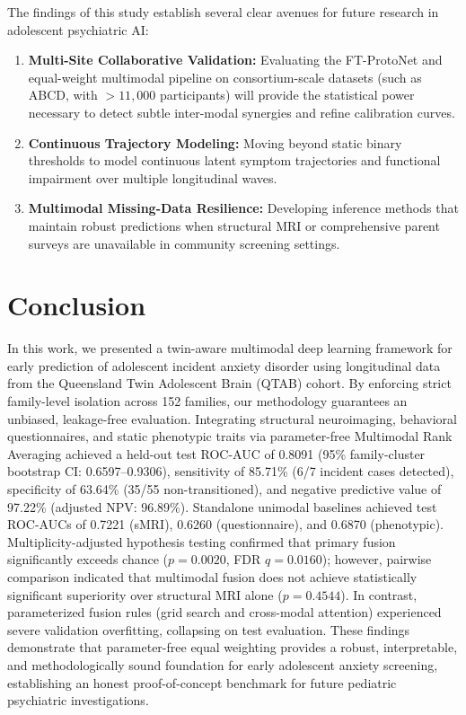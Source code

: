 \documentclass[10pt,letterpaper]{article}
\begin{document}
The findings of this study establish several clear avenues for future research in adolescent psychiatric AI:
\begin{enumerate}
    \item \textbf{Multi-Site Collaborative Validation:} Evaluating the FT-ProtoNet and equal-weight multimodal pipeline on consortium-scale datasets (such as ABCD, with $> 11{,}000$ participants) will provide the statistical power necessary to detect subtle inter-modal synergies and refine calibration curves.
    \item \textbf{Continuous Trajectory Modeling:} Moving beyond static binary thresholds to model continuous latent symptom trajectories and functional impairment over multiple longitudinal waves.
    \item \textbf{Multimodal Missing-Data Resilience:} Developing inference methods that maintain robust predictions when structural MRI or comprehensive parent surveys are unavailable in community screening settings.
\end{enumerate}

\section*{Conclusion}

In this work, we presented a twin-aware multimodal deep learning framework for early prediction of adolescent incident anxiety disorder using longitudinal data from the Queensland Twin Adolescent Brain (QTAB) cohort. By enforcing strict family-level isolation across 152 families, our methodology guarantees an unbiased, leakage-free evaluation. Integrating structural neuroimaging, behavioral questionnaires, and static phenotypic traits via parameter-free Multimodal Rank Averaging achieved a held-out test ROC-AUC of 0.8091 (95\% family-cluster bootstrap CI: 0.6597--0.9306), sensitivity of 85.71\% (6/7 incident cases detected), specificity of 63.64\% (35/55 non-transitioned), and negative predictive value of 97.22\% (adjusted NPV: 96.89\%). Standalone unimodal baselines achieved test ROC-AUCs of 0.7221 (sMRI), 0.6260 (questionnaire), and 0.6870 (phenotypic). Multiplicity-adjusted hypothesis testing confirmed that primary fusion significantly exceeds chance ($p = 0.0020$, FDR $q = 0.0160$); however, pairwise comparison indicated that multimodal fusion does not achieve statistically significant superiority over structural MRI alone ($p = 0.4544$). In contrast, parameterized fusion rules (grid search and cross-modal attention) experienced severe validation overfitting, collapsing on test evaluation. These findings demonstrate that parameter-free equal weighting provides a robust, interpretable, and methodologically sound foundation for early adolescent anxiety screening, establishing an honest proof-of-concept benchmark for future pediatric psychiatric investigations.
\end{document}
